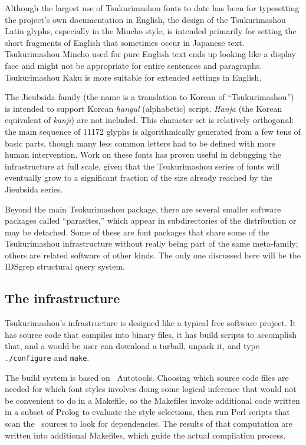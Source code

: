 \documentclass{ltugboat}
\begin{document}
Although the largest use of Tsukurimashou 
\linebreak%
fonts to date has been for
typesetting the project's own documentation in English, the design of the
Tsukurimashou Latin glyphs, especially in the Mincho style, is intended
primarily for setting the short fragments of English that sometimes occur in
\linebreak
Japanese text.  Tsukurimashou Mincho used for
\linebreak%
 pure English text ends up
looking like a display face and might not be appropriate for entire
sentences and paragraphs.  Tsukurimashou Kaku is more suitable for extended
settings in English.

The Jieubsida family (the name is a translation to Korean of
``Tsukurimashou'') is intended to support Korean \emph{hangul} (alphabetic)
script.  \emph{Hanja} (the Korean equivalent of \emph{kanji}) are not
included.  This character set is relatively orthogonal: the main sequence of
11172 glyphs is algorithmically generated from a few tens of basic parts,
though many less common letters had to be defined with more human
intervention.  Work on these fonts has proven useful in debugging the
infrastructure at full scale, given that the Tsukurimashou series of fonts
will eventually grow to a significant fraction of the size already reached
by the Jieubsida series.

Beyond the main Tsukurimashou package,
\linebreak%
 there are several smaller software
packages called ``parasites,'' which appear in subdirectories of the
distribution or may be detached.  Some of these are font packages that share
some of the Tsukurimashou infrastructure without really being part of the
same meta-family; others are related software of other kinds.  The only one
discussed here will be the IDSgrep structural query system.

\subsection{The infrastructure}

Tsukurimashou's infrastructure is designed like a typical free software
project.  It has source code that compiles into binary files, it has build
scripts to accomplish that, and a would-be user can download a tarball,
unpack it, and type \texttt{./configure} and \texttt{make}.

The build system is based on \GNU\ Autotools.  Choosing which source code
files are needed for 
\linebreak%
which font styles involves doing some logical inference
that would not be convenient to do in a Makefile, so the Makefiles invoke
additional code written in a subset of Prolog to evaluate the style
selections, then run Perl scripts that scan the \MF\ sources to look for
dependencies.  The results of that computation are written into additional
Makefiles, which guide the actual compilation process.
\end{document}
